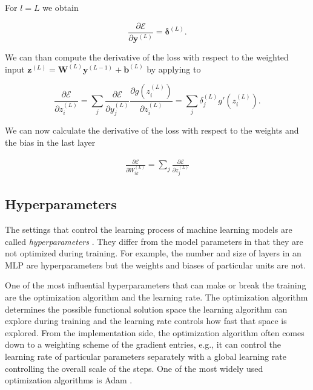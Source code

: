 For $l = L$ we obtain

\begin{equation}
  \frac{\partial \mathcal{E}}{\partial \pmb{y}^{(L)}} = \pmb{\delta}^{(L)}.
\end{equation}

We can than compute the derivative of the loss with respect to the weighted input $\pmb{z}^{(L)} = \pmb{W}^{(L)} \pmb{y}^{(L-1)} + \pmb{b}^{(L)}$ by applying  to 

\begin{equation}
  \frac{\partial \mathcal{E}}{\partial z_i^{(L)}} = \sum \limits_j \frac{\partial \mathcal{E}}{\partial y_j^{(L)}} \frac{\partial g(z_i^{(L)})}{\partial z_i^{(L)}} = \sum \limits_j \delta_j^{(L)} g'(z_i^{(L)}).
\end{equation}

We can now calculate the derivative of the loss with respect to the weights and the bias in the last layer

\begin{align}
  \frac{\partial \mathcal{E}}{\partial W_{ik}^{(L)}} = \sum \limits_j \frac{\partial \mathcal{E}}{\partial z_j^{(L)}} 
\end{align}

\subsection*{Hyperparameters}

The settings that control the learning process of machine learning models are called \emph{hyperparameters} \cite{Goodfellow-et-al-2016}. They differ from the model parameters in that they are not optimized during training. For example, the number and size of layers in an \ac{MLP} are hyperparameters but the weights and biases of particular units are not.

One of the most influential hyperparameters that can make or break the training are the optimization algorithm and the learning rate. The optimization algorithm determines the possible functional solution space the learning algorithm can explore during training and the learning rate controls how fast that space is explored. From the implementation side, the optimization algorithm often comes down to a weighting scheme of the gradient entries, e.g., it can control the learning rate of particular parameters separately with a global learning rate controlling the overall scale of the steps. One of the most widely used optimization algorithms is Adam \cite{Kingma2017}.

